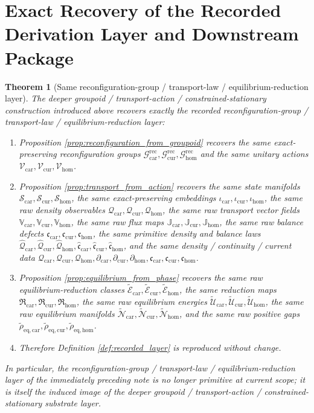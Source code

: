 \documentclass[11pt]{article}
\newcommand{\TensorCurrent}{\mathfrak c_{\mathrm{car}}}
\newcommand{\CurCurrent}{\mathfrak c_{\mathrm{cur}}}
\newcommand{\HomCurrent}{\mathfrak c_{\mathrm{hom}}}
\newcommand{\TensorDensity}{\mathcal Q_{\mathrm{car}}}
\newcommand{\CurDensity}{\mathcal Q_{\mathrm{cur}}}
\newcommand{\HomDensity}{\mathcal Q_{\mathrm{hom}}}
\newcommand{\TensorCont}{\partial_{\mathrm{car}}}
\newcommand{\CurCont}{\partial_{\mathrm{cur}}}
\newcommand{\HomCont}{\partial_{\mathrm{hom}}}
\newcommand{\TensorPrimitiveDensity}{\widehat{\mathcal Q}_{\mathrm{car}}}
\newcommand{\CurPrimitiveDensity}{\widehat{\mathcal Q}_{\mathrm{cur}}}
\newcommand{\HomPrimitiveDensity}{\widehat{\mathcal Q}_{\mathrm{hom}}}
\newcommand{\TensorBalance}{\widehat{\mathfrak c}_{\mathrm{car}}}
\newcommand{\CurBalance}{\widehat{\mathfrak c}_{\mathrm{cur}}}
\newcommand{\HomBalance}{\widehat{\mathfrak c}_{\mathrm{hom}}}
\newcommand{\TensorReconGroup}{\mathcal G_{\mathrm{car}}^{\mathrm{rec}}}
\newcommand{\CurReconGroup}{\mathcal G_{\mathrm{cur}}^{\mathrm{rec}}}
\newcommand{\HomReconGroup}{\mathcal G_{\mathrm{hom}}^{\mathrm{rec}}}
\newcommand{\TensorReconAct}{\mathscr V_{\mathrm{car}}}
\newcommand{\CurReconAct}{\mathscr V_{\mathrm{cur}}}
\newcommand{\HomReconAct}{\mathscr V_{\mathrm{hom}}}
\newcommand{\TensorStateManifold}{\mathcal S_{\mathrm{car}}}
\newcommand{\CurStateManifold}{\mathcal S_{\mathrm{cur}}}
\newcommand{\HomStateManifold}{\mathcal S_{\mathrm{hom}}}
\newcommand{\TensorStateEmbed}{\iota_{\mathrm{car}}}
\newcommand{\CurStateEmbed}{\iota_{\mathrm{cur}}}
\newcommand{\HomStateEmbed}{\iota_{\mathrm{hom}}}
\newcommand{\TensorRawDensity}{\boldsymbol{\mathcal Q}_{\mathrm{car}}}
\newcommand{\CurRawDensity}{\boldsymbol{\mathcal Q}_{\mathrm{cur}}}
\newcommand{\HomRawDensity}{\boldsymbol{\mathcal Q}_{\mathrm{hom}}}
\newcommand{\TensorTransport}{\mathbb V_{\mathrm{car}}}
\newcommand{\CurTransport}{\mathbb V_{\mathrm{cur}}}
\newcommand{\HomTransport}{\mathbb V_{\mathrm{hom}}}
\newcommand{\TensorFlux}{\mathbb J_{\mathrm{car}}}
\newcommand{\CurFlux}{\mathbb J_{\mathrm{cur}}}
\newcommand{\HomFlux}{\mathbb J_{\mathrm{hom}}}
\newcommand{\TensorRawBalance}{\boldsymbol{\mathfrak c}_{\mathrm{car}}}
\newcommand{\CurRawBalance}{\boldsymbol{\mathfrak c}_{\mathrm{cur}}}
\newcommand{\HomRawBalance}{\boldsymbol{\mathfrak c}_{\mathrm{hom}}}
\newcommand{\TensorRawEqClass}{\widetilde{\mathscr E}_{\mathrm{car}}}
\newcommand{\CurRawEqClass}{\widetilde{\mathscr E}_{\mathrm{cur}}}
\newcommand{\HomRawEqClass}{\widetilde{\mathscr E}_{\mathrm{hom}}}
\newcommand{\TensorEqReduce}{\mathfrak R_{\mathrm{car}}}
\newcommand{\CurEqReduce}{\mathfrak R_{\mathrm{cur}}}
\newcommand{\HomEqReduce}{\mathfrak R_{\mathrm{hom}}}
\newcommand{\TensorRawEnergy}{\widetilde{\mathcal U}_{\mathrm{car}}}
\newcommand{\CurRawEnergy}{\widetilde{\mathcal U}_{\mathrm{cur}}}
\newcommand{\HomRawEnergy}{\widetilde{\mathcal U}_{\mathrm{hom}}}
\newcommand{\TensorRawEqManifold}{\widetilde{\mathcal N}_{\mathrm{car}}}
\newcommand{\CurRawEqManifold}{\widetilde{\mathcal N}_{\mathrm{cur}}}
\newcommand{\HomRawEqManifold}{\widetilde{\mathcal N}_{\mathrm{hom}}}
\newcommand{\RawCarGap}{\widetilde\rho_{\mathrm{eq,car}}}
\newcommand{\RawCurGap}{\widetilde\rho_{\mathrm{eq,cur}}}
\newcommand{\RawHomGap}{\widetilde\rho_{\mathrm{eq,hom}}}
\newtheorem{theorem}{Theorem}
\begin{document}
\section{Exact Recovery of the Recorded Derivation Layer and Downstream Package}

\begin{theorem}[Same reconfiguration-group / transport-law / equilibrium-reduction layer]
\label{thm:same_layer}
The deeper groupoid / transport-action / constrained-stationary construction introduced above recovers exactly the recorded reconfiguration-group / transport-law / equilibrium-reduction layer:
\begin{enumerate}
    \item Proposition \ref{prop:reconfiguration_from_groupoid} recovers the same exact-preserving reconfiguration groups \(\TensorReconGroup,\CurReconGroup,\HomReconGroup\) and the same unitary actions \(\TensorReconAct,\CurReconAct,\HomReconAct\).
    \item Proposition \ref{prop:transport_from_action} recovers the same state manifolds \(\TensorStateManifold,\CurStateManifold,\HomStateManifold\), the same exact-preserving embeddings \(\TensorStateEmbed,\CurStateEmbed,\HomStateEmbed\), the same raw density observables \(\TensorRawDensity,\CurRawDensity,\HomRawDensity\), the same raw transport vector fields \(\TensorTransport,\CurTransport,\HomTransport\), the same raw flux maps \(\TensorFlux,\CurFlux,\HomFlux\), the same raw balance defects \(\TensorRawBalance,\CurRawBalance,\HomRawBalance\), the same primitive density and balance laws \(\TensorPrimitiveDensity,\CurPrimitiveDensity,\HomPrimitiveDensity,\TensorBalance,\CurBalance,\HomBalance\), and the same density / continuity / current data \(\TensorDensity,\CurDensity,\HomDensity,\TensorCont,\CurCont,\HomCont,\TensorCurrent,\CurCurrent,\HomCurrent\).
    \item Proposition \ref{prop:equilibrium_from_phase} recovers the same raw equilibrium-reduction classes \(\TensorRawEqClass,\CurRawEqClass,\HomRawEqClass\), the same reduction maps \(\TensorEqReduce,\CurEqReduce,\HomEqReduce\), the same raw equilibrium energies \(\TensorRawEnergy,\CurRawEnergy,\HomRawEnergy\), the same raw equilibrium manifolds \(\TensorRawEqManifold,\CurRawEqManifold,\HomRawEqManifold\), and the same raw positive gaps \(\RawCarGap,\RawCurGap,\RawHomGap\).
    \item Therefore Definition \ref{def:recorded_layer} is reproduced without change.
\end{enumerate}
In particular, the reconfiguration-group / transport-law / equilibrium-reduction layer of the immediately preceding note is no longer primitive at current scope; it is itself the induced image of the deeper groupoid / transport-action / constrained-stationary substrate layer.
\end{theorem}
\end{document}
